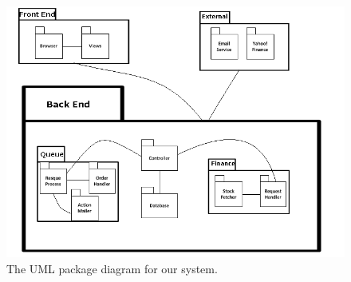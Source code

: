 \begin{figure}[H]
\centering
\includegraphics[width=7in]{./img/package.png}
\caption{The UML package diagram for our system.}
\end{figure}
